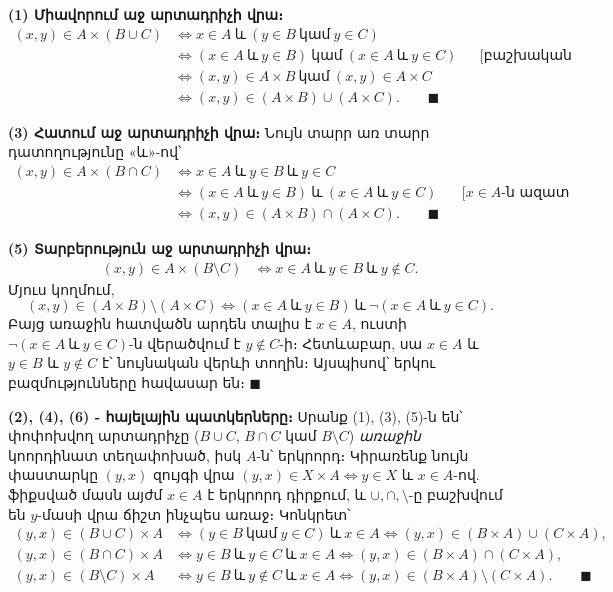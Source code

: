 \documentclass[11pt,a4paper]{article}
\begin{document}
\textbf{(1) Միավորում աջ արտադրիչի վրա։}
\begin{align*}
(x,y)\in A\times(B\cup C)
&\iff x\in A\ \text{և}\ (y\in B\ \text{կամ}\ y\in C)\\
&\iff (x\in A\ \text{և}\ y\in B)\ \text{կամ}\ (x\in A\ \text{և}\ y\in C)
   &&\text{[բաշխական օրենք]}\\
&\iff (x,y)\in A\times B\ \text{կամ}\ (x,y)\in A\times C\\
&\iff (x,y)\in(A\times B)\cup(A\times C). \qquad\blacksquare
\end{align*}

\textbf{(3) Հատում աջ արտադրիչի վրա։} Նույն տարր առ տարր դատողությունը «և»-ով՝
\begin{align*}
(x,y)\in A\times(B\cap C)
&\iff x\in A\ \text{և}\ y\in B\ \text{և}\ y\in C\\
&\iff (x\in A\ \text{և}\ y\in B)\ \text{և}\ (x\in A\ \text{և}\ y\in C)
   &&\text{[$x\in A$-ն ազատ կրկնվում է]}\\
&\iff (x,y)\in(A\times B)\cap(A\times C). \qquad\blacksquare
\end{align*}

\textbf{(5) Տարբերություն աջ արտադրիչի վրա։}
\begin{align*}
(x,y)\in A\times(B\setminus C)
&\iff x\in A\ \text{և}\ y\in B\ \text{և}\ y\notin C.
\end{align*}
Մյուս կողմում,
$$(x,y)\in(A\times B)\setminus(A\times C)\iff (x\in A\ \text{և}\ y\in B)\ \text{և}\ \neg(x\in A\ \text{և}\ y\in C).$$
Բայց առաջին հատվածն արդեն տալիս է $x\in A$, ուստի $\neg(x\in A\ \text{և}\ y\in C)$-ն վերածվում է
$y\notin C$-ի։ Հետևաբար, սա $x\in A$ և $y\in B$ և $y\notin C$ է՝ նույնական վերևի տողին։ Այսպիսով՝ երկու
բազմությունները հավասար են։ $\blacksquare$

\textbf{(2), (4), (6) - հայելային պատկերները։}
Սրանք (1), (3), (5)-ն են՝ փոփոխվող արտադրիչը (${B\cup C}$, ${B\cap C}$ կամ ${B\setminus C}$)
\emph{առաջին} կոորդինատ տեղափոխած, իսկ $A$-ն՝ երկրորդ։ Կիրառենք նույն
փաստարկը $(y,x)$ զույգի վրա $(y,x)\in X\times A\iff y\in X$ և $x\in A$-ով. ֆիքսված մասն այժմ $x\in A$ է
երկրորդ դիրքում, և $\cup,\cap,\setminus$-ը բաշխվում են $y$-մասի վրա ճիշտ ինչպես առաջ։ Կոնկրետ՝
\begin{align*}
(y,x)\in(B\cup C)\times A &\iff (y\in B\ \text{կամ}\ y\in C)\ \text{և}\ x\in A
  \iff (y,x)\in(B\times A)\cup(C\times A),\\
(y,x)\in(B\cap C)\times A &\iff y\in B\ \text{և}\ y\in C\ \text{և}\ x\in A
  \iff (y,x)\in(B\times A)\cap(C\times A),\\
(y,x)\in(B\setminus C)\times A &\iff y\in B\ \text{և}\ y\notin C\ \text{և}\ x\in A
  \iff (y,x)\in(B\times A)\setminus(C\times A).\qquad\blacksquare
\end{align*}
\end{document}
